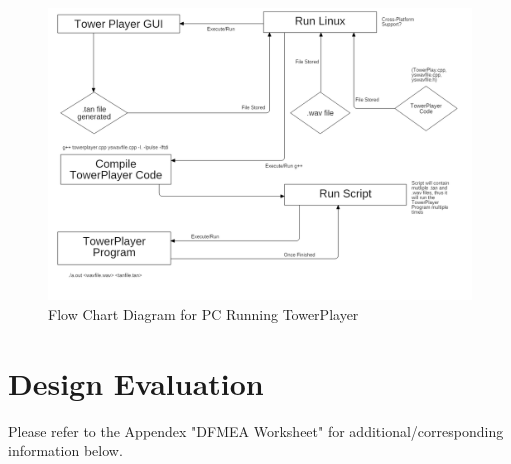 \documentclass[12pt]{article}
\begin{document}
{{{{		\begin{figure}[ht!]
			\centering
			\includegraphics[width=150mm]{assets/PCRunningTowerPlayerFlowChartDiagram.png}
			\caption{Flow Chart Diagram for PC Running TowerPlayer \label{overflow}}
		\end{figure}
	
		\clearpage
		
		
	\section{Design Evaluation}
	Please refer to the Appendex "DFMEA Worksheet" for additional/corresponding information below.
	
}}}}
\end{document}

